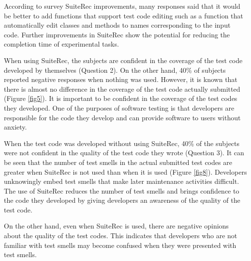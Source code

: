 \documentclass[conference]{IEEEtran}
\begin{document}
According to survey SuiteRec improvements, many responses said that it would be better to add functions that support test code editing such as a function that automatically edit classes and methods to names corresponding to the input code. Further improvements in SuiteRec show the potential for reducing the completion time of experimental tasks.

When using SuiteRec, the subjects are confident in the coverage of the test code developed by themselves (Question 2). On the other hand, 40\% of subjects reported negative responses when nothing was used. However, it is known that there is almost no difference in the coverage of the test code actually submitted (Figure \ref{fig5}). It is important to be confident in the coverage of the test codes they developed. One of the purposes of software testing is that developers are responsible for the code they develop and can provide software to users without anxiety.

When the test code was developed without using SuiteRec, 40\% of the subjects were not confident in the quality of the test code they wrote (Question 3). It can be seen that the number of test smells in the actual submitted test codes are greater when SuiteRec is not used than when it is used (Figure \ref{fig8}). Developers unknowingly embed test smells that make later maintenance activities difficult. The use of SuiteRec reduces the number of test smells and brings confidence to the code they developed by giving developers an awareness of the quality of the test code.

On the other hand, even when SuiteRec is used, there are negative opinions about the quality of the test codes. This indicates that developers who are not familiar with test smells may become confused when they were presented with test smells.
\end{document}
